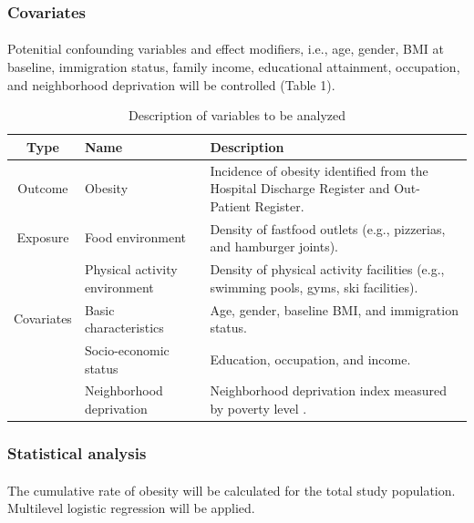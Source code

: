 \documentclass[12]{article}
\begin{document}
\subsubsection{Covariates}
\paragraph{}
Potenitial confounding variables and effect modifiers, i.e., age, gender, BMI at baseline, immigration status, family income, educational attainment, occupation, and neighborhood deprivation will be controlled (Table 1).  

\begin{table}[h!]
		    \caption{Description of variables to be analyzed}
		    \label{table:aim1}
		      \centering
		      \begin{tabular}{ c l p{5cm} }
			    \hline
			    Type & Name & Description\\
			    \hline \hline
			    Outcome & Obesity & Incidence of obesity identified from the Hospital Discharge Register and Out-Patient Register.\\
			    Exposure & Food environment & Density of fastfood outlets (e.g., pizzerias, and hamburger joints).\\
			             & Physical activity environment &  Density of physical activity facilities (e.g., swimming pools, gyms, ski facilities)\cite{kawakami2011health}.\\
			    Covariates & Basic characteristics & Age, gender, baseline BMI, and immigration status. \\
			               & Socio-economic status & Education, occupation, and income.\\
				            & Neighborhood deprivation & Neighborhood deprivation index measured by poverty level \cite{kawakami2011differences}.\\
          \hline
			    \end{tabular}
			  \end{table}
\subsubsection{Statistical analysis}
\paragraph{}
The cumulative rate of obesity will be calculated for the total study population. Multilevel logistic regression will be applied.
	    
\end{document}
